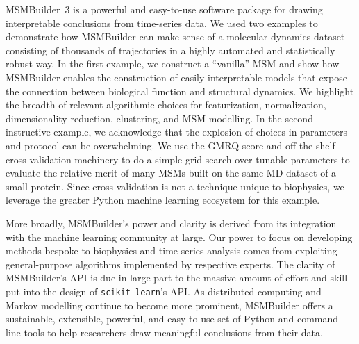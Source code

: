 MSMBuilder~3 is a powerful and easy-to-use software package for drawing
interpretable conclusions from time-series data. We used two examples to
demonstrate how MSMBuilder can make sense of a molecular dynamics dataset
consisting of thousands of trajectories in a highly automated and
statistically robust way. In the first example, we construct a ``vanilla''
MSM and show how MSMBuilder enables the construction of
easily-interpretable models that expose the connection between biological function
and structural dynamics.  We highlight the breadth of relevant algorithmic choices for
featurization, normalization, dimensionality reduction, clustering, and MSM
modelling.  In the second instructive example, we acknowledge that the
explosion of choices in parameters and protocol can be overwhelming. We use
the GMRQ score and off-the-shelf cross-validation machinery to do a simple
grid search over tunable parameters to evaluate the relative merit of many
MSMs built on the same MD dataset of a small protein. Since
cross-validation is not a technique unique to biophysics, we leverage the
greater Python machine learning ecosystem for this example.

More broadly, MSMBuilder's power and clarity is derived from its integration
with the machine learning community at large. Our power to focus on
developing methods bespoke to biophysics and time-series analysis comes
from exploiting general-purpose algorithms implemented by respective
experts. The clarity of MSMBuilder's API is due in large part to the
massive amount of effort and skill put into the design of
\texttt{scikit-learn}'s API. As distributed computing and Markov modelling
continue to become more prominent, MSMBuilder offers a sustainable,
extensible, powerful, and easy-to-use set of Python and command-line tools
to help researchers draw meaningful conclusions from their data.

